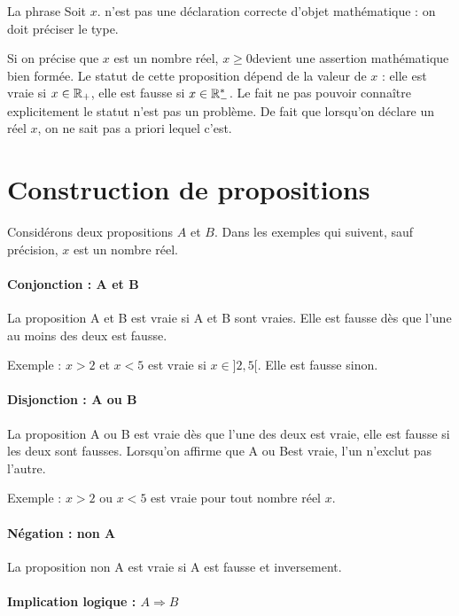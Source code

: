 La phrase \og Soit $x$.\fg{} n'est pas une déclaration correcte  d'objet mathématique : on doit préciser le type.

Si on précise que $x$ est un nombre réel, \og$x\geq 0$\fg devient une assertion mathématique bien formée. Le statut de cette proposition dépend de la valeur de $x$ : elle est vraie si $x\in \mathbb{R}_+$, elle est fausse si $x\in \mathbb{R}_-^*$. Le fait ne pas pouvoir connaître explicitement le statut n'est pas un problème. De fait que lorsqu'on déclare un réel $x$, on ne sait pas a priori lequel c'est.



\section{Construction de propositions}

Considérons deux propositions $A$ et $B$. Dans les exemples qui suivent, sauf précision, $x$ est un nombre réel.

\paragraph{Conjonction : \og A et B\fg} 

La proposition \og A et B \fg{} est vraie si A et B sont vraies. Elle est fausse dès que l'une au moins des deux est fausse.

Exemple : \og$x>2$ et $x<5$\fg{} est vraie si $x\in]2,5[$. Elle est fausse sinon.

\paragraph{Disjonction : \og A ou B\fg} 

La proposition  \og A ou B\fg{} est vraie dès que l'une des deux est vraie, elle est fausse si les deux sont fausses. Lorsqu'on affirme que \og A ou B\fg est vraie, l'un n'exclut pas l'autre.

Exemple : \og $x>2$ ou $x<5$\fg{} est vraie pour tout nombre réel $x$.

\paragraph{Négation : \og non A\fg}

 La proposition \og non A\fg{} est vraie si A est fausse et inversement.

\paragraph{Implication logique : \og$A \Rightarrow B$\fg}

